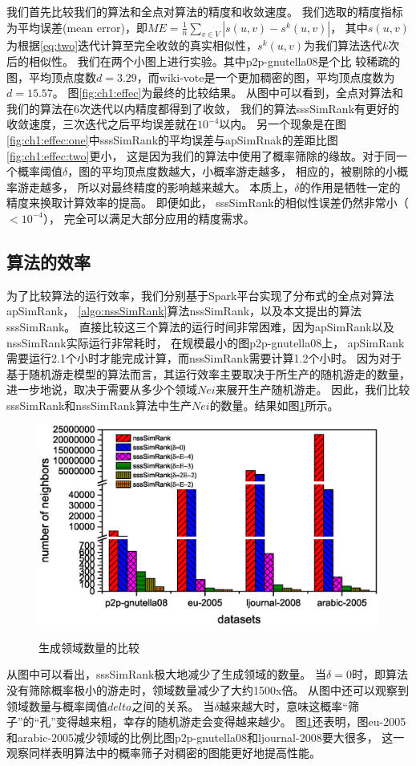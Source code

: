 \documentclass[master]{njuthesis}
\begin{document}
我们首先比较我们的算法和全点对算法的精度和收敛速度。
我们选取的精度指标为平均误差(mean error)，即$ME = \frac{1}{n}\sum_{v \in V}{\left|s(u,v) - s^k(u,v)\right|}$，
其中$s(u,v)$为根据\ref{eq:two}迭代计算至完全收敛的真实相似性，$s^k(u,v)$为我们算法迭代$k$次后的相似性。
我们在两个小图上进行实验。其中p2p-gnutella08是个比
较稀疏的图，平均顶点度数$d=3.29$，而wiki-vote是一个更加稠密的图，平均顶点度数为$d=15.57$。
图\ref{fig:ch1:effec}为最终的比较结果。
从图中可以看到，全点对算法和我们的算法在6次迭代以内精度都得到了收敛， 我们的算法sssSimRank有更好的收敛速度，三次迭代之后平均误差就在$10^{-4}$以内。
另一个现象是在图\ref{fig:ch1:effec:one}中sssSimRank的平均误差与apSimRnak的差距比图\ref{fig:ch1:effec:two}更小，
这是因为我们的算法中使用了概率筛除的缘故。对于同一个概率阈值$\delta$，图的平均顶点度数越大，小概率游走越多， 相应的，被剔除的小概率游走越多，
所以对最终精度的影响越来越大。 本质上，$\delta$的作用是牺牲一定的精度来换取计算效率的提高。
即便如此， sssSimRank的相似性误差仍然非常小（$<10^{-4}$）， 完全可以满足大部分应用的精度需求。
\subsection{算法的效率}
为了比较算法的运行效率，我们分别基于Spark平台实现了分布式的全点对算法apSimRank， \ref{algo:nssSimRank}算法nssSimRank，以及本文提出的算法sssSimRank。
直接比较这三个算法的运行时间非常困难，因为apSimRank以及nssSimRank实际运行非常耗时，
在规模最小的图p2p-gnutella08上， apSimRank需要运行2.1个小时才能完成计算，而nssSimRank需要计算1.2个小时。
因为对于基于随机游走模型的算法而言，其运行效率主要取决于所生产的随机游走的数量，进一步地说，取决于需要从多少个领域$Nei$来展开生产随机游走。
因此，我们比较sssSimRank和nssSimRank算法中生产$Nei$的数量。结果如图\ref{fig:ch1:runtime}所示。
\begin{figure}[htbp]
  \centering
  \includegraphics[width= 1\textwidth]{figure/neighborhoods.eps}\\
  \caption{生成领域数量的比较}\label{fig:ch1:runtime}
\end{figure}
从图中可以看出，sssSimRank极大地减少了生成领域的数量。
当$\delta=0$时，即算法没有筛除概率极小的游走时，领域数量减少了大约1500x倍。
从图中还可以观察到领域数量与概率阈值$delta$之间的关系。
当$\delta$越来越大时，意味这概率“筛子”的“孔”变得越来粗，幸存的随机游走会变得越来越少。
图\ref{fig:ch1:runtime}还表明，图eu-2005和arabic-2005减少领域的比例比图p2p-gnutella08和ljournal-2008要大很多，
这一观察同样表明算法中的概率筛子对稠密的图能更好地提高性能。
\end{document}
